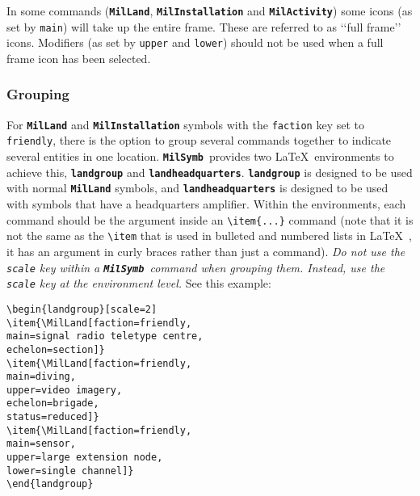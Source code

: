 \documentclass[a4paper, titlepage]{article}
\newcommand\MilSymb{\textbf{\texttt{MilSymb}}}
\newenvironment{writett}{\ttfamily}{\par}
\begin{document}
In some commands (\textbf{\texttt{MilLand}}, \textbf{\texttt{MilInstallation}} and \textbf{\texttt{MilActivity}}) some icons (as set by \texttt{main}) will take up the entire frame. These are referred to as \lq\lq{}full frame\rq\rq{} icons. Modifiers (as set by \texttt{upper} and \texttt{lower}) should not be used when a full frame icon has been selected.

\subsubsection{Grouping}

For \textbf{\texttt{MilLand}} and \textbf{\texttt{MilInstallation}} symbols with the \texttt{faction} key set to \texttt{friendly}, there is the option to group several commands together to indicate several entities in one location. \MilSymb\  provides two \LaTeX\ environments to achieve this, \textbf{\texttt{landgroup}} and \textbf{\texttt{landheadquarters}}.  \textbf{\texttt{landgroup}} is designed to be used with normal \textbf{\texttt{MilLand}} symbols, and \textbf{\texttt{landheadquarters}} is designed to be used with symbols that have a headquarters amplifier. Within the environments, each command should be the argument inside an \texttt{\textbackslash item\{...\}} command (note that it is not the same as the \texttt{\textbackslash item} that is used in bulleted and numbered lists in \LaTeX\ , it has an argument in curly braces rather than just a command). \textit{Do not use the \texttt{scale} key within a \MilSymb\ command when grouping them. Instead, use the \texttt{scale} key at the environment level.} See this example:\\

\begin{writett}
\begin{verbatim}
\begin{landgroup}[scale=2]
\item{\MilLand[faction=friendly, 
main=signal radio teletype centre, 
echelon=section]}
\item{\MilLand[faction=friendly, 
main=diving, 
upper=video imagery, 
echelon=brigade, 
status=reduced]}
\item{\MilLand[faction=friendly, 
main=sensor, 
upper=large extension node, 
lower=single channel]}
\end{landgroup}
\end{verbatim}
\end{writett}
\end{document}
